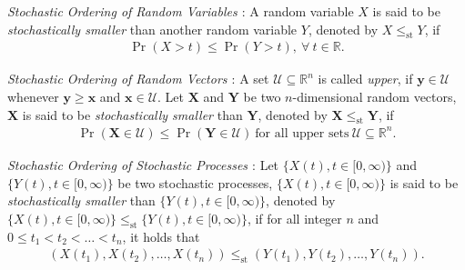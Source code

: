 %


\begin{definition}\label{def_variable}
\emph{Stochastic Ordering of Random Variables \cite{StochasticOrderBook}}: 
A random variable ${X}$ is said to be \emph{stochastically smaller} than another random variable ${Y}$, denoted by ${X}\leq_{\text{st}}{Y}$, if 
\begin{align}
\Pr({X}>t) \leq \Pr({Y}>t),~\forall~t\in \mathbb{R}. 
\end{align}
\end{definition}
\begin{definition}\label{def_vector}
\emph{Stochastic Ordering of Random Vectors \cite{StochasticOrderBook}}: 
A set $\mathcal{U} \subseteq \mathbb{R}^n$ is called \emph{upper}, if $\bm{y} \in \mathcal{U}$ whenever $\bm{y}\geq \bm{x}$ and $\bm{x} \in \mathcal{U}$. 
Let $\bm{X}$ and $\bm{Y}$ be two $n$-dimensional random vectors, $\bm{X}$ is said to be \emph{stochastically smaller} than $\bm{Y}$, denoted by $\bm{X}\leq_{\text{st}}\bm{Y}$, if 
\begin{align}
\Pr(\bm{X}\in \mathcal{U}) \leq \Pr(\bm{Y}\in \mathcal{U})~\text{for all upper sets}~\mathcal{U}\subseteq \mathbb{R}^n.
\end{align}
\end{definition}
\begin{definition}\label{def_process}
\emph{Stochastic Ordering of Stochastic Processes \cite{StochasticOrderBook}}: 
Let $\{X(t),t\in [0,\infty) \}$ and $\{Y(t),t\in [0,\infty) \}$ be two stochastic processes, $\{X(t), t\in [0,\infty) \}$ is said to be \emph{stochastically smaller} than $\{Y(t),t\in [0,\infty) \}$, denoted by $\{X(t),t\in [0,\infty) \}\leq_{\text{st}}\{Y(t),t\in [0,\infty)\}$, if for all integer $n$ and $0\leq t_1< t_2<\ldots<t_n$, it holds that 
\begin{align}
\!\!\!(X(t_1),X(t_2),\ldots,X(t_n)) \!\leq_{\text{st}}\! (Y(t_1),Y(t_2),\ldots,Y(t_n)).\!\!\!
\end{align}
\end{definition}

